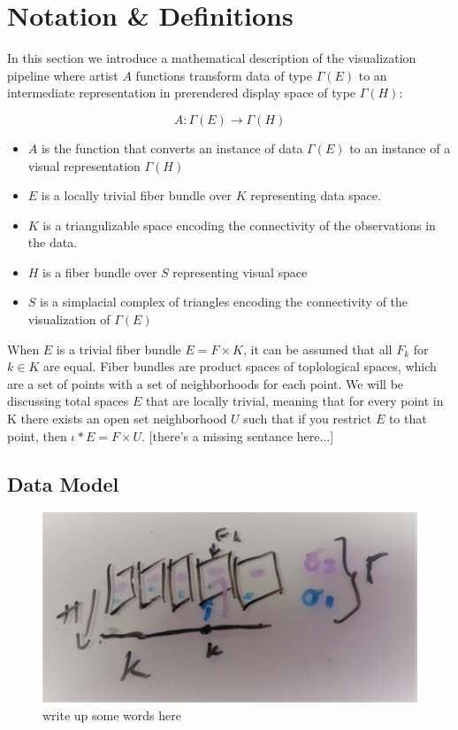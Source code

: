 \documentclass[../main.tex]{subfiles}
\begin{document}
\section{Notation \& Definitions}
In this section we introduce a mathematical description of the visualization pipeline where artist $A$ functions transform data of type $\Gamma(E)$ to an intermediate representation in prerendered display space of type $\Gamma(H)$:

\begin{equation}
    A: \Gamma(E) \rightarrow \Gamma(H)
    \label{eq:artist}
\end{equation}

\begin{itemize}
\item $A$ is the function that converts an instance of data $\Gamma(E)$ to an instance of a visual representation $\Gamma(H)$ 
\item $E$ is a locally trivial fiber bundle over $K$ representing data space.
\item $K$ is a triangulizable space encoding the connectivity of the observations in the data. 
\item $H$ is a fiber bundle over $S$ representing visual space
\item $S$ is a simplacial complex of triangles encoding the connectivity of the visualization of $\Gamma(E)$
\end{itemize}

When $E$ is a trivial fiber bundle $E = F \times K$, it can be assumed that all $F_{k}$ for $k \in K$ are equal. Fiber bundles are product spaces of toplological spaces, which are a set of points with a set of neighborhoods for each point\cite{some topology text book, really wikipedia}. We will be discussing total spaces $E$ that are locally trivial, meaning that for every point in K there exists an open set neighborhood $U$ such that if you restrict $E$ to that point, then  $\iota*E = F\times U$. [there's a missing sentance here...]


\subsection{Data Model}
\begin{figure}[ht]
    \label{fig:fiberbundle}
    \includegraphics[width=.2\linewidth]{figures/sections/math/fiberbundle.png}
    \caption{write up some words here}
\end{figure}
\end{document}
